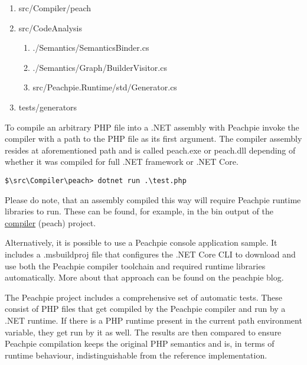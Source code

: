 \begin{enumerate}
	\item \label{peach}src/Compiler/peach	
	\item src/CodeAnalysis
	\begin{enumerate}
		\item ./Semantics/SemanticsBinder.cs
		\item ./Semantics/Graph/BuilderVisitor.cs
		\item src/Peachpie.Runtime/std/Generator.cs
	\end{enumerate}
	\item tests/generators
\end{enumerate}

To compile an arbitrary PHP file into a .NET assembly with Peachpie invoke the compiler with a path to the PHP file as its first argument. The compiler assembly resides at aforementioned path and is called peach.exe or peach.dll depending of whether it was compiled for full .NET framework or .NET Core.

\begin{verbatim}
$\src\Compiler\peach> dotnet run .\test.php
\end{verbatim}

Please do note, that an assembly compiled this way will require Peachpie runtime libraries to run. These can be found, for example, in the bin output of the \hyperref[peach]{compiler} (peach) project.

Alternatively, it is possible to use a Peachpie console application sample\footnotemark. It includes a .msbuildproj file that configures the .NET Core CLI to download and use both the Peachpie compiler toolchain and required runtime libraries automatically. More about that approach can be found on the peachpie blog\footnotemark.



The Peachpie project includes a comprehensive set of automatic tests. These consist of PHP files that get compiled by the Peachpie compiler and run by a .NET runtime. If there is a PHP runtime present in the current path environment variable, they get run by it as well. The results are then compared to ensure Peachpie compilation keeps the original PHP semantics and is, in terms of runtime behaviour, indistinguishable from the reference implementation.


